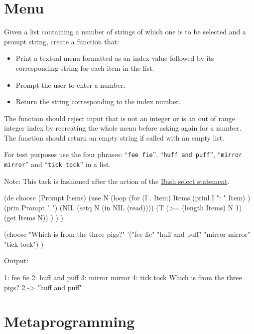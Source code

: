 \pagebreak{}
\section*{Menu}

Given a list containing a number of strings of which one is to be
selected and a prompt string, create a function that:

\begin{itemize}
\item
  Print a textual menu formatted as an index value followed by its
  corresponding string for each item in the list.
\item
  Prompt the user to enter a number.
\item
  Return the string corresponding to the index number.
\end{itemize}

The function should reject input that is not an integer or is an out of
range integer index by recreating the whole menu before asking again for
a number. The function should return an empty string if called with an
empty list.

For test purposes use the four phrases: ``\texttt{fee fie}'',
``\texttt{huff and puff}'', ``\texttt{mirror mirror}'' and
``\texttt{tick tock}'' in a list.

Note: This task is fashioned after the action of the
\href{http://www.softpanorama.org/Scripting/Shellorama/Control\_structures/select\_statements.shtml}{Bash
  select statement}.

\begin{wideverbatim}

(de choose (Prompt Items)
   (use N
      (loop
         (for (I . Item) Items
            (prinl I ": " Item) )
         (prin Prompt " ")
         (NIL (setq N (in NIL (read))))
         (T (>= (length Items) N 1) (get Items N)) ) ) )

(choose "Which is from the three pigs?"
   '("fee fie" "huff and puff" "mirror mirror" "tick tock") )

Output:

1: fee fie
2: huff and puff
3: mirror mirror
4: tick tock
Which is from the three pigs? 2
-> "huff and puff"

\end{wideverbatim}

\pagebreak{}
\section*{Metaprogramming}


